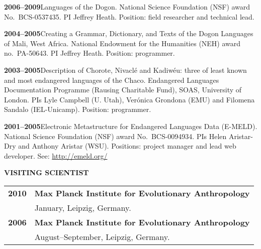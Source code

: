\documentclass[11pt]{article}
\newcommand{\hangpara}{
 \setlength{\parindent}{0in} %
 \hangindent=0.42in %
}
\begin{document}
\vskip 6pt
\hangpara
{\bf 2006--2009}\hspace{1ex}Languages of the Dogon. National Science Foundation (NSF) award No.\ BCS-0537435. PI Jeffrey Heath. Position: field researcher and technical lead.

\vskip 6pt
\hangpara
{\bf 2004--2005}\hspace{1ex}Creating a Grammar, Dictionary, and Texts of the Dogon Languages of Mali, West Africa. National Endowment for the Humanities (NEH) award no.\ PA-50643. PI Jeffrey Heath. Position: programmer.

\vskip 6pt
\hangpara
{\bf 2003--2005}\hspace{1ex}Description of Chorote, Nivacl{\'e} and Kadiw{\'e}u: three of least known and most endangered languages of the Chaco. Endangered Languages Documentation Programme (Rausing Charitable Fund), SOAS, University of London. PIs Lyle Campbell (U. Utah), Ver{\'o}nica Grondona (EMU) and Filomena Sandalo (IEL-Unicamp). Position: programmer.


\vskip 6pt
\hangpara
{\bf 2001--2005}\hspace{1ex}Electronic Metastructure for Endangered Languages Data (E-MELD). National Science Foundation (NSF) award No.\ BCS-0094934. PIs Helen Aristar-Dry and Anthony Aristar (WSU). Positions: project manager and lead web developer. See: \url{http://emeld.org/}

\vskip 20pt
\begin{flushleft}
{\bf VISITING SCIENTIST}
\end{flushleft}
\begin{tabular}{lp{5.5in}}
\bf 2010	& {\bf Max Planck Institute for Evolutionary Anthropology}\\
& January, Leipzig, Germany.  \\
\bf 2006	& {\bf Max Planck Institute for Evolutionary Anthropology}\\
& August--September, Leipzig, Germany.  \\
\end{tabular}
\end{document}
